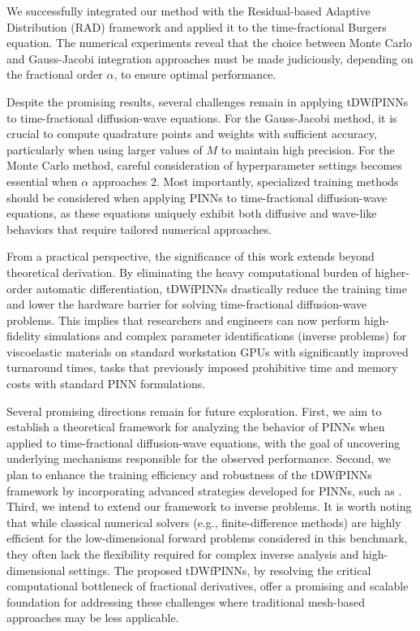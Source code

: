 \documentclass[preprint,3p,times]{elsarticle}
\begin{document}
We successfully integrated our method with the Residual-based Adaptive Distribution (RAD) framework and applied it to the time-fractional Burgers equation. The numerical experiments reveal that the choice between Monte Carlo and Gauss-Jacobi integration approaches must be made judiciously, depending on the fractional order $\alpha$, to ensure optimal performance.

Despite the promising results, several challenges remain in applying tDWfPINNs to time-fractional diffusion-wave equations. For the Gauss-Jacobi method, it is crucial to compute quadrature points and weights with sufficient accuracy, particularly when using larger values of $M$ to maintain high precision. For the Monte Carlo method, careful consideration of hyperparameter settings becomes essential when $\alpha$ approaches 2. Most importantly, specialized training methods should be considered when applying PINNs to time-fractional diffusion-wave equations, as these equations uniquely exhibit both diffusive and wave-like behaviors that require tailored numerical approaches.

From a practical perspective, the significance of this work extends beyond theoretical derivation. By eliminating the heavy computational burden of higher-order automatic differentiation, tDWfPINNs drastically reduce the training time and lower the hardware barrier for solving time-fractional diffusion-wave problems. This implies that researchers and engineers can now perform high-fidelity simulations and complex parameter identifications (inverse problems) for viscoelastic materials on standard workstation GPUs with significantly improved turnaround times, tasks that previously imposed prohibitive time and memory costs with standard PINN formulations.

Several promising directions remain for future exploration. First, we aim to establish a theoretical framework for analyzing the behavior of PINNs when applied to time-fractional diffusion-wave equations, with the goal of uncovering underlying mechanisms responsible for the observed performance. Second, we plan to enhance the training efficiency and robustness of the tDWfPINNs framework by incorporating advanced strategies developed for PINNs, such as \cite{Wang2022:causality, WangYuParis:2022:NTK}. Third, we intend to extend our framework to inverse problems. It is worth noting that while classical numerical solvers (e.g., finite-difference methods) are highly efficient for the low-dimensional forward problems considered in this benchmark, they often lack the flexibility required for complex inverse analysis and high-dimensional settings. The proposed tDWfPINNs, by resolving the critical computational bottleneck of fractional derivatives, offer a promising and scalable foundation for addressing these challenges where traditional mesh-based approaches may be less applicable.
\end{document}

